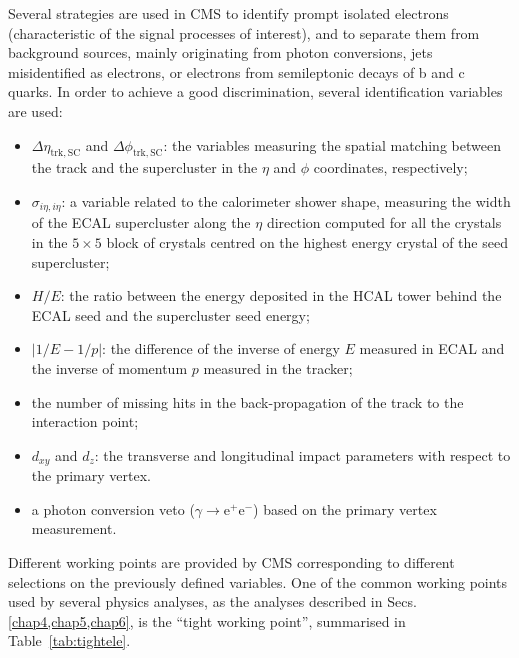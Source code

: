 Several strategies are used in CMS to identify prompt isolated electrons (characteristic of the signal processes of interest), and to separate them from background sources, mainly originating from photon conversions, jets misidentified as electrons, or electrons from semileptonic decays of b and c quarks. In order to achieve a good discrimination, several identification variables are used:
\begin{itemize}
\item $\Delta\eta_\mathrm{trk,SC}$ and $\Delta\phi_\mathrm{trk,SC}$: the variables measuring the spatial matching between the track and the supercluster in the $\eta$ and $\phi$ coordinates, respectively;
\item $\sigma_{i\eta,i\eta}$: a variable related to the calorimeter shower shape, measuring the width of the ECAL supercluster along the $\eta$ direction computed for all the crystals in the $5
\times 5$ block of crystals centred on the highest energy crystal of the seed supercluster;
\item $H/E$: the ratio between the energy deposited in the HCAL tower behind the ECAL seed and the supercluster seed energy;
\item $|1/E - 1/p|$: the difference of the inverse of energy $E$ measured in ECAL and the inverse of momentum $p$ measured in the tracker;
\item the number of missing hits in the back-propagation of the track to the interaction point;
\item $d_{xy}$ and $d_z$: the transverse and longitudinal impact parameters with respect to the primary vertex.
\item a photon conversion veto ($\gamma \to \mathrm{e^+ e^-}$) based on the primary vertex measurement.
\end{itemize}

Different working points are provided by CMS corresponding to different selections on the previously defined variables. One of the common working points used by several physics analyses, as the \hww analyses described in Secs.\ref{chap4,chap5,chap6}, is the ``tight working point'', summarised in Table~\ref{tab:tightele}.

